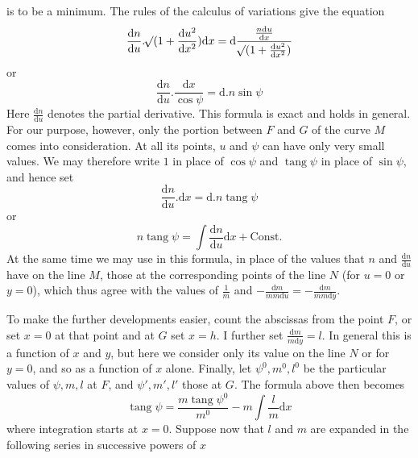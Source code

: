 %
is to be a minimum. The rules of the calculus of variations give the equation
\[
\frac{\mathrm{d}n}{\mathrm{d}u}\mathord{.}\mathord{{}^{}\!\surd}(1+\frac{\mathrm{d}u^2}{\mathrm{d}x^2})\mathrm{d}x=\mathrm{d}\frac{\frac{n\mathrm{d}u}{\mathrm{d}x}}{\mathord{{}^{}\!\surd}(1+\frac{\mathrm{d}u^2}{\mathrm{d}x^2})}
\]
or
\[
\frac{\mathrm{d}n}{\mathrm{d}u}\mathord{.}\frac{\mathrm{d}x}{\cos\psi}=\mathrm{d}\mathord{.}n\sin\psi
\]
Here \(\tfrac{\mathrm{d}n}{\mathrm{d}u}\) denotes the partial derivative. This formula is exact and holds in general. For our purpose, however, only the portion between \(F\) and \(G\) of the curve \(M\) comes into consideration. At all its points, \(u\) and \(\psi\) can have only very small values. We may therefore write \(1\) in place of \(\cos\psi\) and \(\operatorname{tang}\psi\) in place of \(\sin\psi\), and hence set
\[
\frac{\mathrm{d}n}{\mathrm{d}u}\mathord{.}\mathrm{d}x=\mathrm{d}\mathord{.}n\operatorname{tang}\psi
\]
or
\[
n\operatorname{tang}\psi=\int\frac{\mathrm{d}n}{\mathrm{d}u}\mathrm{d}x+\text{Const.}
\]
At the same time we may use in this formula, in place of the values that \(n\) and \(\tfrac{\mathrm{d}n}{\mathrm{d}u}\) have on the line \(M\), those at the corresponding points of the line \(N\) (for \(u=0\) or \(y=0\)), which thus agree with the values of \(\tfrac{1}{m}\) and \(-\tfrac{\mathrm{d}m}{mm\mathrm{d}u}=-\tfrac{\mathrm{d}m}{mm\mathrm{d}y}\).

To make the further developments easier, count the abscissas from the point \(F\), or set \(x=0\) at that point and at \(G\) set \(x=h\). I further set \(\tfrac{\mathrm{d}m}{m\mathrm{d}y}=l\). In general this is a function of \(x\) and \(y\), but here we consider only its value on the line \(N\) or for \(y=0\), and so as a function of \(x\) alone. Finally, let \(\psi^0,m^0,l^0\) be the particular values of \(\psi,m,l\) at \(F\), and \(\psi',m',l'\) those at \(G\). The formula above then becomes
\[
\operatorname{tang}\psi=\frac{m\operatorname{tang}\psi^0}{m^0}-m\int\frac{l}{m}\mathrm{d}x
\]
where integration starts at \(x=0\). Suppose now that \(l\) and \(m\) are expanded in the following series in successive powers of \(x\)
